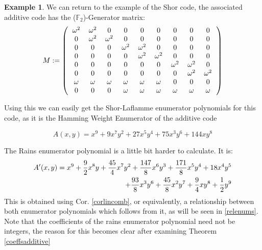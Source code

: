 \documentclass[12pt,a4paper,BCOR15mm,twoside,DIV12]{article}
\def\F{\mathbb{F}}
\theoremstyle{definition}
\newtheorem{ex}[Satz]{Example}
\begin{document}
\begin{ex}\label{enumshor}
We can return to the example of the Shor code, the associated additive code has the ($\F_2$)-Generator matrix: \\

\begin{equation*} M:= 
\left( \begin{tabular}{ccccccccc}
$\omega^ 2$ & $\omega^ 2$ & 0 & 0 & 0 & 0 & 0 & 0 & 0 \\ 
0 & $\omega^ 2$ & $\omega^ 2$ & 0 & 0 & 0 & 0 & 0 & 0 \\
0 & 0 & 0 & $\omega^ 2$ & $\omega^ 2$ & 0 & 0 & 0 & 0 \\
0 & 0 & 0 & 0 & $\omega^ 2$ & $\omega^ 2$&  0 & 0 & 0 \\
0 & 0 & 0 & 0 & 0 & 0 & $\omega^ 2$ & $\omega^ 2$ & 0 \\
0 & 0 & 0 & 0 & 0 & 0 & 0 & $\omega^ 2$ & $\omega^ 2$ \\
$\omega$ & $\omega$ & $\omega$ & $\omega$ & $\omega$ & $\omega$ & 0 & 0 & 0 \\
0 & 0 & 0 & $\omega$ & $\omega$ & $\omega$ & $\omega$ & $\omega$ & $\omega$ \\
\end{tabular} \right)
\end{equation*}

Using this we can easily get the Shor-Laflamme enumerator polynomials for this code, as it is the Hamming Weight Enumerator 
of the additive code

\begin{equation}
A(x,y) = x^9 + 9 x^7y^2 + 27 x^5y^4 + 75 x^3y^6 + 144 xy^8
\end{equation}

The Rains enumerator polynomial is a little bit harder to calculate. It is:
\begin{align}
A'(x,y) =  x^9 + \frac9 2 x^8y + \frac{45}{4} x^7y^2 + \frac{147}{8} x^6y^3 + \frac{171}{8} x^5y^4 + 18 x^4 y^5 \notag \\ + \frac{93}{8} x^3 y^6 + \frac{45}{8} x^2 y^7 + \frac 9 4 x y^8 + \frac 1 2 y^9
 \end{align}
This is obtained using Cor. \ref{corlincomb}, or equivalently, a relationship between both enumerator polynomials which follows from it, as will be seen in \ref{relenums}. Note that the coefficients of the rains enumerator polynomial need not be integers,
the reason for this becomes clear after examining Theorem \ref{coeffsadditive}
\end{ex}
\end{document}
